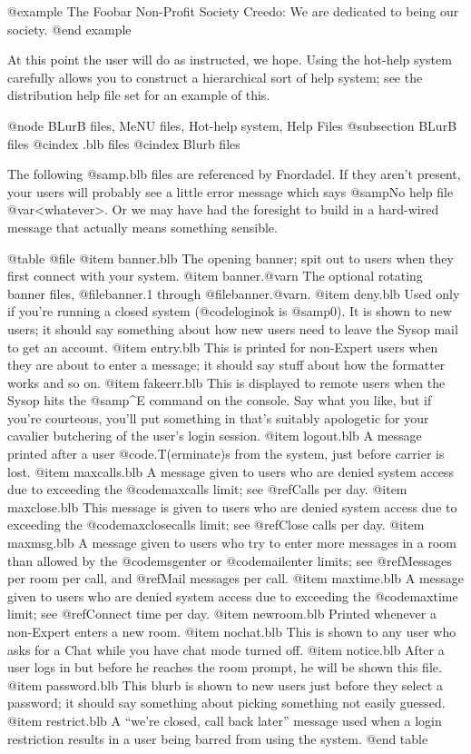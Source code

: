 {{{@example
The Foobar Non-Profit Society Creedo:
We are dedicated to being our society.
@end example

At this point the user will do as instructed, we hope.
Using the hot-help system carefully allows you to construct a
hierarchical sort of help system; see the distribution help file
set for an example of this.

@node BLurB files, MeNU files, Hot-help system, Help Files
@subsection BLurB files
@cindex .blb files
@cindex Blurb files

The following @samp{.blb} files are referenced by Fnordadel.
If they aren't present, your users will probably see a little
error message which says @samp{No help file @var{<whatever>}}.
Or we may have had the foresight to build in a hard-wired message
that actually means something sensible.

@table @file
@item banner.blb
The opening banner; spit out to users when
they first connect with your system.
@item banner.@var{n}
The optional rotating banner files, @file{banner.1} through
@file{banner.@var{n}}.
@item deny.blb
Used only if you're running a closed
system (@code{loginok} is @samp{0}).  It is shown to
new users; it should say something about
how new users need to leave the Sysop
mail to get an account.
@item entry.blb
This is printed for non-Expert users when
they are about to enter a message; it should
say stuff about how the formatter works
and so on.
@item fakeerr.blb
This is displayed to remote users when the Sysop hits the
@samp{^E} command on the console.  Say what you like, but
if you're courteous, you'll put something in that's
suitably apologetic for your cavalier butchering of the
user's login session.
@item logout.blb
A message printed after a user @code{.T(erminate)}s
from the system, just before carrier is lost.
@item maxcalls.blb
A message given to users who are denied
system access due to exceeding the @code{maxcalls}
limit; see @ref{Calls per day}.
@item maxclose.blb
This message is given to users who are denied
system access due to exceeding the
@code{maxclosecalls} limit; see @ref{Close calls per day}.
@item maxmsg.blb
A message given to users who try to enter
more messages in a room than allowed by the
@code{msgenter} or @code{mailenter} limits; see
@ref{Messages per room per call},
and @ref{Mail messages per call}.
@item maxtime.blb
A message given to users who are denied
system access due to exceeding the @code{maxtime}
limit; see @ref{Connect time per day}.
@item newroom.blb
Printed whenever a non-Expert enters a new
room.
@item nochat.blb
This is shown to any user who asks for a
Chat while you have chat mode turned off.
@item notice.blb
After a user logs in but before he reaches
the room prompt, he will be shown this file.
@item password.blb
This blurb is shown to new users just before
they select a password; it should say
something about picking something not easily
guessed.
@item restrict.blb
A ``we're closed, call back later'' message
used when a login restriction results in a
user being barred from using the system.
@end table

}}}
